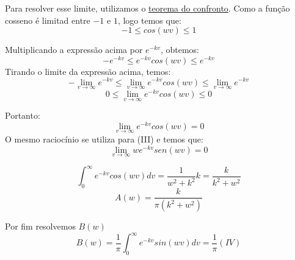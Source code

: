 Para resolver esse limite, utilizamos o \underline{teorema do confronto}. Como a função cosseno é limitad entre $-1$ e $1$, logo temos que:
\begin{equation*}
    -1\leq cos(wv) \leq 1
\end{equation*}

Multiplicando a expressão acima por $e^{-kv}$, obtemos:
\begin{equation*}
    -e^{-kv} \leq e^{-kv}cos(wv) \leq e^{-kv}
\end{equation*}
Tirando o limite da expressão acima, temos:
\begin{equation*}
    - \lim_{v\rightarrow \infty}e^{-kv} \leq  \lim_{v\rightarrow \infty}e^{-kv}cos(wv) \leq  \lim_{v\rightarrow \infty}e^{-kv}
\end{equation*}
\begin{equation*}
    0 \leq  \lim_{v\rightarrow \infty}e^{-kv}cos(wv) \leq  0
\end{equation*}

Portanto:
\begin{equation*}
    \boxed{\lim_{v\rightarrow \infty}e^{-kv}cos(wv) =  0}
\end{equation*}
O mesmo raciocínio se utiliza para (III) e temos que:
\begin{equation*}
    \boxed{\lim_{v\rightarrow \infty}we^{-kv}sen(wv) =  0}
\end{equation*}

\begin{equation*}
    \int_0^\infty e^{-kv} cos(wv)dv = \frac{1}{w^2 + k^2}k = \frac{k}{k^2+ w^2}
\end{equation*}
\begin{equation*}
    \boxed{A(w) = \frac{k}{\pi(k^2+w^2)}}
\end{equation*}

Por fim resolvemos $B(w)$
\begin{equation*}
    B(w) = \frac{1}{\pi}\int_0^\infty e^{-kv}sin(wv)dv = \frac{1}{\pi}(IV)
\end{equation*}


